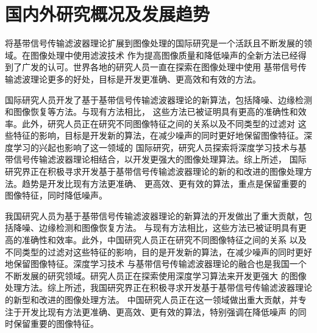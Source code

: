 %
%
%
%

\section{国内外研究概况及发展趋势}

将基带信号传输滤波器理论扩展到图像处理的国际研究是一个活跃且不断发展的领域。在图像处理中使用滤波技术
作为提高图像质量和降低噪声的全新方法已经得到了广发的认可。世界各地的研究人员一直在探索在图像处理中使用
基带信号传输滤波理论更多的好处，目标是开发更准确、更高效和有效的方法。

国际研究人员开发了基于基带信号传输滤波器理论的新算法，包括降噪、边缘检测和图像恢复等方法。与现有方法相比，
这些方法已被证明具有更高的准确性和效率。此外，研究人员正在研究不同图像特征之间的关系以及不同类型的过滤对
这些特征的影响，目标是开发新的算法，在减少噪声的同时更好地保留图像特征。深度学习的兴起也影响了这一领域的
国际研究，研究人员探索将深度学习技术与基带信号传输滤波器理论相结合，以开发更强大的图像处理算法。综上所述，
国际研究界正在积极寻求开发基于基带信号传输滤波器理论的新的和改进的图像处理方法。趋势是开发比现有方法更准确、
更高效、更有效的算法，重点是保留重要的图像特征，同时降低噪声。

我国研究人员为基于基带信号传输滤波器理论的新算法的开发做出了重大贡献，包括降噪、边缘检测和图像恢复方法。
与现有方法相比，这些方法已被证明具有更高的准确性和效率。此外，中国研究人员正在研究不同图像特征之间的关系
以及不同类型的过滤对这些特征的影响，目的是开发新的算法，在减少噪声的同时更好地保留图像特征。深度学习技术
与基带信号传输滤波器理论的融合也是我国一个不断发展的研究领域。研究人员正在探索使用深度学习算法来开发更强大
的图像处理方法。综上所述，我国研究界正在积极寻求开发基于基带信号传输滤波器理论的新型和改进的图像处理方法。
中国研究人员正在这一领域做出重大贡献，并专注于开发比现有方法更准确、更高效、更有效的算法，特别强调在降低噪声
的同时保留重要的图像特征。

